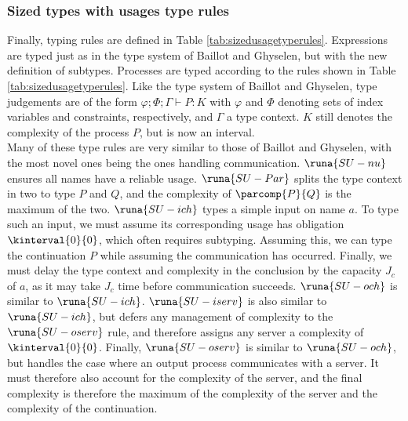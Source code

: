 \subsubsection{Sized types with usages type rules}

Finally, typing rules are defined in Table \ref{tab:sizedusagetyperules}. Expressions are typed just as in the type system of Baillot and Ghyselen, but with the new definition of subtypes. Processes are typed according to the rules shown in Table \ref{tab:sizedusagetyperules}. Like the type system of Baillot and Ghyselen, type judgements are of the form $\varphi;\Phi;\Gamma\vdash P : K$ with $\varphi$ and $\Phi$ denoting sets of index variables and constraints, respectively, and $\Gamma$ a type context. $K$ still denotes the complexity of the process $P$, but is now an interval.\\

Many of these type rules are very similar to those of Baillot and Ghyselen, with the most novel ones being the ones handling communication. $\runa{SU-nu}$ ensures all names have a reliable usage. $\runa{SU-Par}$ splits the type context in two to type $P$ and $Q$, and the complexity of $\parcomp{P}{Q}$ is the maximum of the two. $\runa{SU-ich}$ types a simple input on name $a$. To type such an input, we must assume its corresponding usage has obligation $\kinterval{0}{0}$, which often requires subtyping. Assuming this, we can type the continuation $P$ while assuming the communication has occurred. Finally, we must delay the type context and complexity in the conclusion by the capacity $J_c$ of $a$, as it may take $J_c$ time before communication succeeds. $\runa{SU-och}$ is similar to $\runa{SU-ich}$. $\runa{SU-iserv}$ is also similar to $\runa{SU-ich}$, but defers any management of complexity to the $\runa{SU-oserv}$ rule, and therefore assigns any server a complexity of $\kinterval{0}{0}$. Finally, $\runa{SU-oserv}$ is similar to $\runa{SU-och}$, but handles the case where an output process communicates with a server. It must therefore also account for the complexity of the server, and the final complexity is therefore the maximum of the complexity of the server and the complexity of the continuation.

